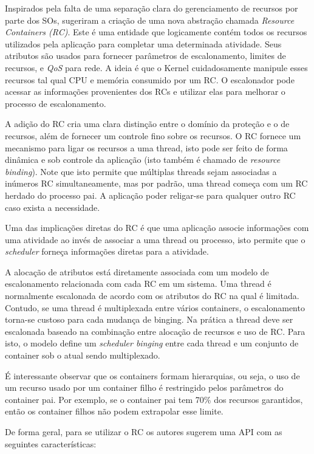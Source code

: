 Inspirados pela falta de uma separação clara do gerenciamento de recursos por
parte dos SOs, \cite{resourcecontainers} sugeriram a criação de uma nova
abstração chamada \emph{Resource Containers (RC)}. Este é uma entidade que
logicamente contém todos os recursos utilizados pela aplicação para completar
uma determinada atividade. Seus atributos são usados para fornecer parâmetros
de escalonamento, limites de recursos, e \emph{QoS} para rede. A ideia é que o
Kernel cuidadosamente manipule esses recursos tal qual CPU e memória consumido
por um RC. O escalonador pode acessar as informações provenientes dos RCs e
utilizar elas para melhorar o processo de escalonamento.

A adição do RC cria uma clara distinção entre o domínio da proteção e o de
recursos, além de fornecer um controle fino sobre os recursos. O RC fornece um
mecanismo para ligar os recursos a uma thread, isto pode ser feito de forma
dinâmica e sob controle da aplicação (isto também é chamado de \emph{resource
binding}). Note que isto permite que múltiplas threads sejam associadas a
inúmeros RC simultaneamente, mas por padrão, uma thread começa com um RC
herdado do processo pai. A aplicação poder religar-se para qualquer outro RC
caso exista a necessidade.

Uma das implicações diretas do RC é que uma aplicação associe informações com
uma atividade ao invés de associar a uma thread ou processo, isto permite que
o \emph{scheduler} forneça informações diretas para a atividade.

A alocação de atributos está diretamente associada com um modelo de
escalonamento relacionada com cada RC em um sistema. Uma thread é normalmente
escalonada de acordo com os atributos do RC na qual é limitada. Contudo, se uma
thread é multiplexada entre vários containers, o escalonamento torna-se custoso
para cada mudança de binging. Na prática a thread deve ser escalonada baseado
na combinação entre alocação de recursos e uso de RC. Para isto, o modelo
define um \emph{scheduler binging} entre cada thread e um conjunto de container
sob o atual sendo multiplexado. 

É interessante observar que os containers formam hierarquias, ou seja, o uso de
um recurso usado por um container filho é restringido pelos parâmetros do
container pai. Por exemplo, se o container pai tem 70\% dos recursos
garantidos, então os container filhos não podem extrapolar esse limite.

De forma geral, para se utilizar o RC os autores sugerem uma API com as
seguintes características:

